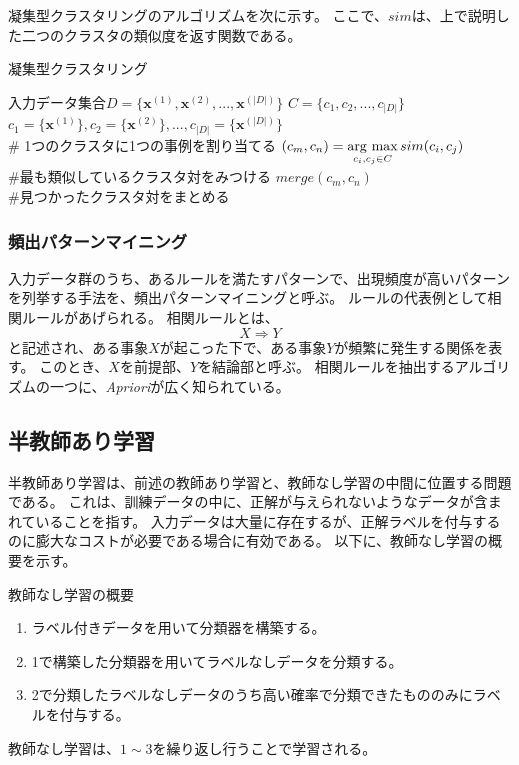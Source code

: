 \documentclass[titlepage,12pt]{jreport}
\newcommand{\argmax}{\mathop{\rm arg~max}\limits}
\begin{document}
凝集型クラスタリングのアルゴリズムを次に示す。 ここで、\(sim\)は、上で説明した二つのクラスタの類似度を返す関数である。
\begin{algorithm}
	\caption{凝集型クラスタリング}
	\label{algo2}
	\begin{algorithmic}[1]
		\REQUIRE 入力データ集合$D = \{\bm{x}^{(1)},\bm{x}^{(2)},...,\bm{x}^{(|D|)}\}$
	\STATE $C = \{c_{1},c_{2},...,c_{|D|}\}$
		\STATE $c_{1} = \{\bm{x}^{(1)}\},c_{2} = \{\bm{x}^{(2)}\},...,c_{|D|} = \{\bm{x}^{(|D|)}\}$\\ \# 1つのクラスタに1つの事例を割り当てる
	\STATE $(c_{m},c_{n}) = \argmax_{c_{i},c_{j}\in C}sim(c_{i},c_{j})$\\ \#最も類似しているクラスタ対をみつける
	\STATE $merge(c_{m},c_{n})$\\ \#見つかったクラスタ対をまとめる
	\ENDWHILE
 \end{algorithmic}
	\label{alg:gyo}
\end{algorithm}
\subsubsection{頻出パターンマイニング}
入力データ群のうち、あるルールを満たすパターンで、出現頻度が高いパターンを列挙する手法を、頻出パターンマイニングと呼ぶ。 ルールの代表例として相関ルールがあげられる。 相関ルールとは、
\begin{equation}
X \Rightarrow Y
\end{equation}
と記述され、ある事象$X$が起こった下で、ある事象$Y$が頻繁に発生する関係を表す。 このとき、$X$を前提部、$Y$を結論部と呼ぶ。  相関ルールを抽出するアルゴリズムの一つに、{\it Apriori}\cite{Agrawal94}が広く知られている。
\subsection{半教師あり学習}
半教師あり学習は、前述の教師あり学習と、教師なし学習の中間に位置する問題である。 これは、訓練データの中に、正解が与えられないようなデータが含まれていることを指す。 入力データは大量に存在するが、正解ラベルを付与するのに膨大なコストが必要である場合に有効である。
以下に、教師なし学習の概要を示す。
\begin{itembox}[1]{教師なし学習の概要}
\begin{enumerate}
\item ラベル付きデータを用いて分類器を構築する。
\item 1で構築した分類器を用いてラベルなしデータを分類する。
\item 2で分類したラベルなしデータのうち高い確率で分類できたもののみにラベルを付与する。
\end{enumerate}
\end{itembox}
教師なし学習は、\(1\sim3\)を繰り返し行うことで学習される。
\end{document}
